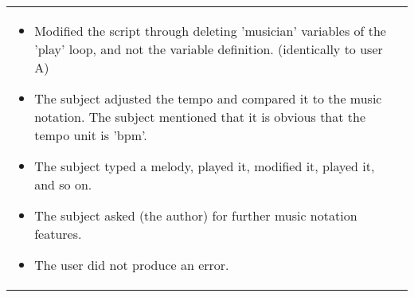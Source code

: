 \begin{longtable}{p{50pt}|p{320pt}}
\begin{itemize}
\item Modified the script through deleting 'musician' variables of the 'play' loop, and not the variable definition. (identically to user A)
\item The subject adjusted the tempo and compared it to the music notation. The subject mentioned that it is obvious that the tempo unit is 'bpm'.
\item The subject typed a melody, played it, modified it, played it, and so on.
\item The subject asked (the author) for further music notation features.
\item The user did not produce an error.
\end{itemize} 
\end{longtable}
